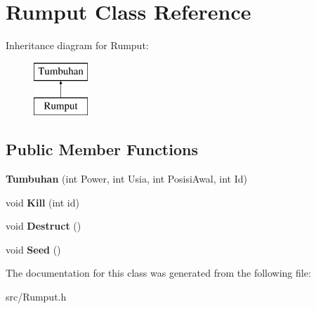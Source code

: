 \hypertarget{class_rumput}{}\section{Rumput Class Reference}
\label{class_rumput}
Inheritance diagram for Rumput\+:\begin{figure}[H]
\begin{center}
\leavevmode
\includegraphics[height=2.000000cm]{class_rumput}
\end{center}
\end{figure}
\subsection*{Public Member Functions}
\begin{DoxyCompactItemize}
\item 
\hypertarget{class_rumput_a8c155d9438a9320ee8b1bc43a34a4c7b}{}{\bfseries Tumbuhan} (int Power, int Usia, int Posisi\+Awal, int Id)\label{class_rumput_a8c155d9438a9320ee8b1bc43a34a4c7b}

\item 
\hypertarget{class_rumput_a3f3f772be251942d9f5c5517d3070e36}{}void {\bfseries Kill} (int id)\label{class_rumput_a3f3f772be251942d9f5c5517d3070e36}

\item 
\hypertarget{class_rumput_ac47b1ece4d9be39237560e8e9ec2ba51}{}void {\bfseries Destruct} ()\label{class_rumput_ac47b1ece4d9be39237560e8e9ec2ba51}

\item 
\hypertarget{class_rumput_aa31831ea757ef45a5c9de5dfd37624cf}{}void {\bfseries Seed} ()\label{class_rumput_aa31831ea757ef45a5c9de5dfd37624cf}

\end{DoxyCompactItemize}


The documentation for this class was generated from the following file\+:\begin{DoxyCompactItemize}
\item 
src/Rumput.\+h\end{DoxyCompactItemize}
